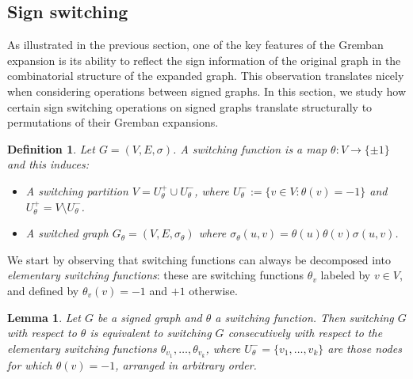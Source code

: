 \documentclass[reprint,onecolumn]{article}
\newtheorem{definition}[theorem]{Definition}  %
\newtheorem{lemma}[theorem]{Lemma}
\newcommand{\1}{\mathbb{1}}
\newcommand{\0}{\mathbf{0}}
\begin{document}
\subsection{Sign switching}

As illustrated in the previous section, one of the key features of the Gremban expansion is its ability to reflect the sign information of the original graph in the combinatorial structure of the expanded graph. This observation translates nicely when considering operations between signed graphs. In this section, we study how certain sign switching operations \cite{zaslavsky1982signed} on signed graphs translate structurally to permutations of their Gremban expansions. 
\begin{definition}
Let $G=(V,E,\sigma)$. A switching function is a map $\theta:V\rightarrow\{\pm 1\}$ and this induces:
\begin{itemize}
    \item A \emph{switching partition} $V=U^+_\theta\cup U^-_\theta$, where $U^-_\theta :=\{v\in V : \theta(v)=-1\}$ and $U^+_\theta= V\setminus U_\theta^-$.
    \item A \emph{switched graph} $G_{\theta} = (V,E,\sigma_\theta)$ where $\sigma_\theta(u,v)=\theta(u)\theta(v)\sigma(u,v)$.
\end{itemize}
\end{definition}
We start by observing that switching functions can always be decomposed into \emph{elementary switching functions}: these are switching functions $\theta_v$ labeled by $v\in V$, and defined by $\theta_v(v)=-1$ and $+1$ otherwise.
\begin{lemma} \label{lem:vertex_vs_global_switching}
Let $G$ be a signed graph and $\theta$ a switching function. Then switching $G$ with respect to $\theta$ is equivalent to switching $G$ consecutively with respect to the elementary switching functions $\theta_{v_1},\dots,\theta_{v_k}$, where $U_\theta^{-}=\{v_1,\dots,v_k\}$ are those nodes for which $\theta(v)=-1$, arranged in arbitrary order. 
\end{lemma}
\end{document}
